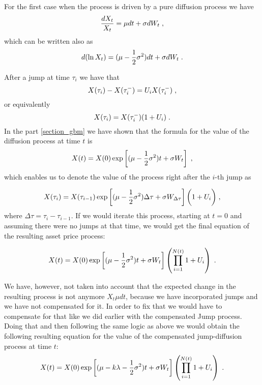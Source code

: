 \documentclass[times, utf8, diplomski]{fer}
\begin{document}
	\noindent For the first case when the process is driven by a pure diffusion process we have
	\begin{equation}
		\frac{dX_t}{X_t} = \mu dt + \sigma dW_t \hspace{0.1cm},
	\end{equation} which can be written also as 
	\begin{equation}
		d(\ln X_t) = (\mu - \frac{1}{2}\sigma^2)dt + \sigma dW_t \hspace{0.1cm}.
	\end{equation}

	\noindent After a jump at time $\tau_i$ we have that
	\begin{equation*}
		X(\tau_i) - X(\tau_i^-) = U_i X(\tau_i^-) \hspace{0.1cm},
	\end{equation*}
	\noindent or equivalently
	\begin{equation}
		X(\tau_i) = X(\tau_i^-)(1 + U_i) \hspace{0.1cm}.
	\end{equation}
	\noindent In the part \ref{section_gbm} we have shown that the formula for the value of the diffusion process at time $t$ is $$X(t) = X(0)\exp\left[ (\mu-\frac{1}{2}\sigma^2)t + \sigma W_t \right]  \hspace{0.1cm}, $$ which enables us to denote the value of the process right after the $i$-th jump as 

	$$X(\tau_i) = X(\tau_{i-1})\exp\left[ (\mu - \frac{1}{2}\sigma^2)\Delta\tau + \sigma W_{\Delta\tau} \right]\bigg(1+U_i\bigg) \hspace{0.1cm},$$ 
	where $\Delta\tau = \tau_i - \tau_{i-1}$. If we would iterate this process, starting at $t=0$ and assuming there were no jumps at that time, we would get the final equation of the resulting asset price process:

	\begin{equation}\label{eqn_jump_diff}
		X(t) = X(0)\exp\left[ (\mu - \frac{1}{2}\sigma^2)t + \sigma W_{t} \right]\left(\prod_{i=1}^{N(t)}1+U_i\right) \hspace{0.1cm}.
	\end{equation}

	\noindent We have, however, not taken into account that the expected change in the resulting process is not anymore $X_t\mu dt$, because we have incorporated jumps and we have not compensated for it. In order to fix that we would have to compensate for that like we did earlier with the compensated Jump process. Doing that and then following the same logic as above we would obtain the following resulting equation for the value of the compensated jump-diffusion process at time $t$:
	\begin{equation} \label{eqn_jump_diff_compensated}
		X(t) = X(0)\exp\left[ (\mu - k\lambda- \frac{1}{2}\sigma^2)t + \sigma W_{t} \right]\left(\prod_{i=1}^{N(t)}1+U_i\right) \hspace{0.1cm}.
	\end{equation}
\end{document}

